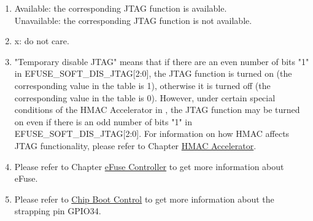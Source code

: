 \begin{tiplisting}
\vspace{-2em}
\begin{enumerate}
\item \label{JTAG footnote: 1}
    Available: the corresponding JTAG function is available. \\
    Unavailable: the corresponding JTAG function is not available.
\item \label{JTAG footnote: 2}
    x: do not care.
\item \label{JTAG footnote: 3}
    "Temporary disable JTAG"  means that if there are an even number of bits "1" in EFUSE\_SOFT\_DIS\_JTAG[2:0], the JTAG function is turned on (the corresponding value in the table is 1), otherwise it is turned off (the corresponding value in the table is 0). However, under certain special conditions of the HMAC Accelerator in \chipname{}, the JTAG function may be turned on even if there is an odd number of bits "1" in EFUSE\_SOFT\_DIS\_JTAG[2:0].
    For information on how HMAC affects JTAG functionality, please refer to Chapter \hyperref[mod:hmac]{HMAC Accelerator}.
\item \label{JTAG footnote: 4}
    Please refer to Chapter \hyperref[mod:efuse]{eFuse Controller} to get more information about eFuse.
\item \label{JTAG footnote: 5}
    Please refer to \hyperref[mod:bootctrl]{Chip Boot Control} to get more information about the strapping pin GPIO34.
\end{enumerate}
\end{tiplisting}
